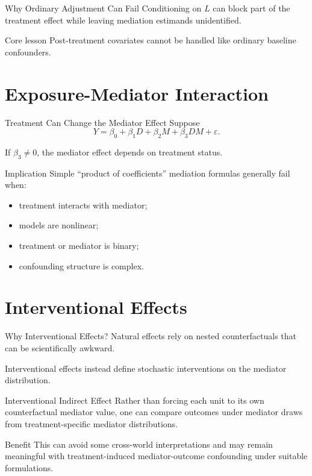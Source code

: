 \documentclass[aspectratio=169,11pt]{beamer}
\begin{document}
\begin{frame}{Why Ordinary Adjustment Can Fail}
Conditioning on \(L\) can block part of the treatment effect while leaving mediation estimands unidentified.

\begin{alertblock}{Core lesson}
Post-treatment covariates cannot be handled like ordinary baseline confounders.
\end{alertblock}
\end{frame}

\section{Exposure-Mediator Interaction}

\begin{frame}{Treatment Can Change the Mediator Effect}
Suppose
\[
Y
=
\beta_0
+
\beta_1 D
+
\beta_2 M
+
\beta_3 D M
+
\varepsilon.
\]

If \(\beta_3\neq 0\), the mediator effect depends on treatment status.
\end{frame}

\begin{frame}{Implication}
Simple “product of coefficients” mediation formulas generally fail when:
\begin{itemize}
\item treatment interacts with mediator;
\item models are nonlinear;
\item treatment or mediator is binary;
\item confounding structure is complex.
\end{itemize}
\end{frame}

\section{Interventional Effects}

\begin{frame}{Why Interventional Effects?}
Natural effects rely on nested counterfactuals that can be scientifically awkward.

Interventional effects instead define stochastic interventions on the mediator distribution.
\end{frame}

\begin{frame}{Interventional Indirect Effect}
Rather than forcing each unit to its own counterfactual mediator value, one can compare outcomes under mediator draws from treatment-specific mediator distributions.

\begin{block}{Benefit}
This can avoid some cross-world interpretations and may remain meaningful with treatment-induced mediator-outcome confounding under suitable formulations.
\end{block}
\end{frame}
\end{document}
